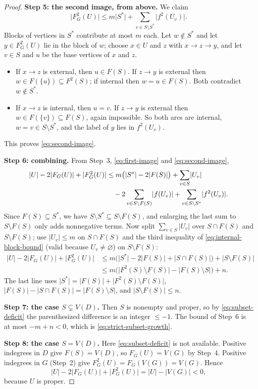 \documentclass[11pt]{article}
\theoremstyle{remark}
\newcommand{\abs}[1]{\lvert #1\rvert}
\newcommand{\Step}[1]{\par\medskip\noindent\textbf{#1}\enspace}
\begin{document}
\begin{proof}
\Step{Step 5: the second image, from above.}
We claim
\begin{equation}\label{eq:second-image}
  \abs{F_G^2(U)}\le m\abs{S^{*}}
     +\sum_{v\in S\setminus S^{*}}\abs{f^2(U_v)}.
\end{equation}
Blocks of vertices in $S^{*}$ contribute at most $m$ each. Let
$w\notin S^{*}$ and let $y\in F_G^2(U)$ lie in the block of $w$; choose
$x\in U$ and $z$ with $x\to z\to y$, and let $v\in S$ and $u$ be the base
vertices of $x$ and $z$.
\begin{itemize}[leftmargin=2em]
\item If $x\to z$ is external, then $u\in F(S)$. If $z\to y$ is external
then $w\in F(\{u\})\subseteq F^2(S)$; if internal then $w=u\in F(S)$. Both
contradict $w\notin S^{*}$.
\item If $x\to z$ is internal, then $u=v$. If $z\to y$ is external then
$w\in F(\{v\})\subseteq F(S)$, again impossible. So both arcs are internal,
$w=v\in S\setminus S^{*}$, and the label of $y$ lies in $f^2(U_v)$.
\end{itemize}
This proves \eqref{eq:second-image}.

\Step{Step 6: combining.}
From Step~3, \eqref{eq:first-image} and \eqref{eq:second-image},
\begin{align}
\label{eq:blowup-sharp}
  \abs{U}-2\abs{F_G(U)}+\abs{F_G^2(U)}
  &\le m\bigl(\abs{S^{*}}-2\abs{F(S)}\bigr)
       +\sum_{v\in S}\abs{U_v} \notag\\
  &\quad -2\sum_{v\in S\setminus F(S)}\abs{f(U_v)}
       +\sum_{v\in S\setminus S^{*}}\abs{f^2(U_v)}.
\end{align}
Since $F(S)\subseteq S^{*}$, we have
$S\setminus S^{*}\subseteq S\setminus F(S)$, and enlarging the last sum to
$S\setminus F(S)$ only adds nonnegative terms. Now split
$\sum_{v\in S}\abs{U_v}$ over $S\cap F(S)$ and $S\setminus F(S)$; use
$\abs{U_v}\le m$ on $S\cap F(S)$ and the third inequality of
\eqref{eq:internal-block-bound} (valid because $U_v\ne\varnothing$) on
$S\setminus F(S)$:
\begin{align*}
  \abs{U}-2\abs{F_G(U)}+\abs{F_G^2(U)}
  &\le m\bigl(\abs{S^{*}}-2\abs{F(S)}
                    +\abs{S\cap F(S)}\bigr)
       +\abs{S\setminus F(S)}\\
  &\le m\bigl(\abs{F^2(S)\setminus F(S)}
                    -\abs{F(S)\setminus S}\bigr)+n.
\end{align*}
The last line uses $\abs{S^{*}}=\abs{F(S)}+\abs{F^2(S)\setminus F(S)}$,
$\abs{F(S)}-\abs{S\cap F(S)}=\abs{F(S)\setminus S}$, and
$\abs{S\setminus F(S)}\le n$.

\Step{Step 7: the case $S\subsetneq V(D)$.}
Then $S$ is nonempty and proper, so by \eqref{eq:subset-deficit} the
parenthesized difference is an integer $\le-1$. The bound of Step~6 is at
most $-m+n<0$, which is \eqref{eq:strict-subset-growth}.

\Step{Step 8: the case $S=V(D)$.}
Here \eqref{eq:subset-deficit} is not available. Positive indegrees in $D$
give $F(S)=V(D)$, so $F_G(U)=V(G)$ by Step~4. Positive indegrees in $G$
(Step~2) give $F_G^2(U)=F_G(V(G))=V(G)$. Hence
\[
  \abs{U}-2\abs{F_G(U)}+\abs{F_G^2(U)}
  =\abs{U}-\abs{V(G)}<0,
\]
because $U$ is proper.
\end{proof}
\end{document}
